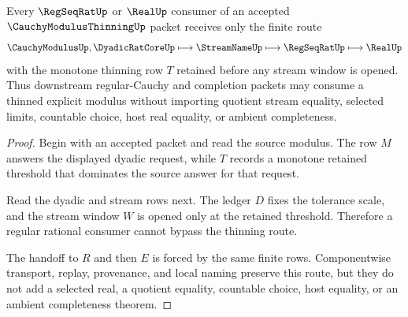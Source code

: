 \begin{theorem}
\label{thm:cauchy-modulus-thinning-real-handoff}
Every $\RegSeqRatUp$ or $\RealUp$ consumer of an accepted $\CauchyModulusThinningUp$ packet receives only the finite route
$$
\CauchyModulusUp,\DyadicRatCoreUp \longmapsto \StreamNameUp \longmapsto \RegSeqRatUp \longmapsto \RealUp
$$
with the monotone thinning row $T$ retained before any stream window is opened. Thus downstream regular-Cauchy and completion packets may consume a thinned explicit modulus without importing quotient stream equality, selected limits, countable choice, host real equality, or ambient completeness.
\end{theorem}
\begin{proof}
Begin with an accepted packet and read the source modulus. The row $M$ answers the displayed dyadic request, while $T$ records a monotone retained threshold that dominates the source answer for that request.

Read the dyadic and stream rows next. The ledger $D$ fixes the tolerance scale, and the stream window $W$ is opened only at the retained threshold. Therefore a regular rational consumer cannot bypass the thinning route.

The handoff to $R$ and then $E$ is forced by the same finite rows. Componentwise transport, replay, provenance, and local naming preserve this route, but they do not add a selected real, a quotient equality, countable choice, host equality, or an ambient completeness theorem.
\end{proof}




